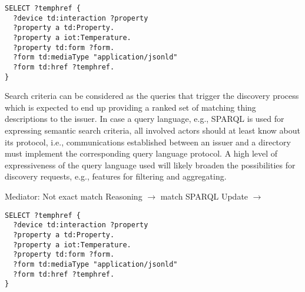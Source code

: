 \begin{lstlisting}[language=sparql,
  				   captionpos=b,
                   label={lst:TDexample},
                   caption={Simple TD example describing a mediator}]
SELECT ?temphref {
  ?device td:interaction ?property
  ?property a td:Property.
  ?property a iot:Temperature.
  ?property td:form ?form.
  ?form td:mediaType "application/jsonld"
  ?form td:href ?temphref.
}
\end{lstlisting}


Search criteria can be considered as the queries that trigger the discovery process which is expected to end up providing a ranked set of matching thing descriptions to the issuer. 
In case a query language, e.g., SPARQL is used for expressing semantic search criteria, all involved actors should at least know about its protocol, i.e., communications established between an issuer and a directory must implement the corresponding query language protocol. 
A high level of expressiveness of the query language used will likely broaden the possibilities
for discovery requests, e.g., features for filtering and aggregating.

Mediator:
Not exact match 
Reasoning $\to$ match
SPARQL Update $\to$ 


\begin{lstlisting}[language=sparql,
  				   captionpos=b,
                   label={lst:TDexample},
                   caption={Simple TD example describing a mediator}]
SELECT ?temphref {
  ?device td:interaction ?property
  ?property a td:Property.
  ?property a iot:Temperature.
  ?property td:form ?form.
  ?form td:mediaType "application/jsonld"
  ?form td:href ?temphref.
}
\end{lstlisting}










